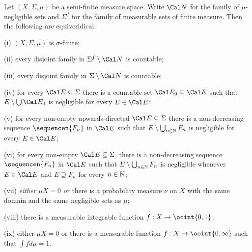  Let $(X,\Sigma,\mu)$ be a semi-finite 
measure space.   Write $\Cal N$ for the family of $\mu$-negligible sets 
and $\Sigma^f$ for the family of measurable sets of finite measure. 
Then the following are equiveridical: 
      
(i) $(X,\Sigma,\mu)$ is $\sigma$-finite; 
      
(ii) every disjoint family in $\Sigma^f\setminus\Cal N$ is countable; 
      
(iii) every disjoint family in $\Sigma\setminus\Cal N$ is countable; 
      
(iv) for every $\Cal E\subseteq\Sigma$ there is a countable set 
$\Cal E_0\subseteq\Cal E$ such that $E\setminus\bigcup\Cal E_0$ is 
negligible for every $E\in\Cal E$; 
      
(v) for every non-empty upwards-directed $\Cal E\subseteq\Sigma$ there 
is a non-decreasing sequence $\sequencen{F_n}$ in $\Cal E$ such that 
$E\setminus\bigcup_{n\in\Bbb N}F_n$ is negligible for every 
$E\in\Cal E$; 
      
(vi) for every non-empty $\Cal E\subseteq\Sigma$, there is a 
non-decreasing sequence $\sequencen{F_n}$ in $\Cal E$ such that 
$E\setminus\bigcup_{n\in\Bbb N}F_n$ is negligible whenever $E\in\Cal E$ 
and $E\supseteq F_n$ for every $n\in\Bbb N$; 
      
(vii) {\it either} $\mu X=0$ {\it or} there is a probability measure 
$\nu$ on $X$ with the same domain and the same negligible sets as $\mu$; 
      
(viii) there is a measurable integrable function $f:X\to\ocint{0,1}$; 
      
(ix) either $\mu X=0$ or there is a measurable function 
$f:X\to\ooint{0,\infty}$ such that $\int fd\mu=1$. 
      
